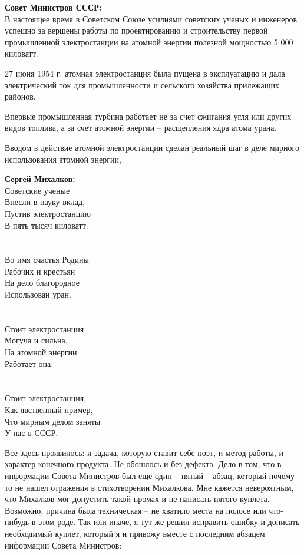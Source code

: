 \documentclass{book}
\begin{document}
\begin{minipage}{0.4\textwidth}
  \textbf{Совет Министров СССР:}\\
  В настоящее время в Советском Союзе усилиями советских ученых и инженеров успешно за вершены работы по проектированию и строительству первой промышленной электростанции на атомной энергии полезной мощностью 5 000 киловатт.
  
  27 июня 1954 г. атомная электростанция была пущена в эксплуатацию и дала электрический ток для промышленности и сельского
  хозяйства прилежащих районов.
  
  Впервые промышленная турбина работает не за счет сжигания угля или других видов топлива, а за счет атомной энергии -- расщепления ядра атома урана. 
  
  Вводом в действие атомной электростанции сделан реальный шаг  в деле мирного использования атомной энергии, 
\end{minipage}
\hfill
\begin{minipage}{0.4\textwidth}
  \textbf{Сергей Михалков:}\\
  Советские ученые \\
  Внесли в науку вклад, \\
  Пустив электростанцию \\
  В пять тысяч киловатт. \\
  \\ \\
  Во имя счастья Родины \\
  Рабочих и крестьян \\
  На дело благородное \\
  Использован уран. \\
  \\  \\
  Стоит электростанция \\
  Могуча и сильна, \\
  На атомной энергии \\
  Работает она. \\
  \\  \\  
  Стоит электростанция, \\
  Как явственный пример, \\
  Что мирным делом заняты \\
  У нас в СССР.
\end{minipage}

Все здесь проявилось: и задача, которую ставит себе поэт, и метод работы, и характер конечного продукта\ldots Не обошлось и без 
дефекта. Дело в том, что в информации Совета Министров был еще один -- пятый -- абзац, который почему-то не нашел отражения в 
стихотворении Михалкова. Мне кажется невероятным, что Михалков мог допустить такой промах и не написать пятого куплета. 
Возможно, причина была техническая -- не хватило места на полосе или что-нибудь в этом роде. Так или иначе, я тут же решил 
исправить ошибку и дописать необходимый куплет, который я и привожу вместе с последним абзацем информации Совета Министров:
\end{document}
